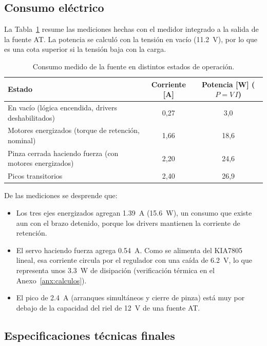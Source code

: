 \subsection{Consumo eléctrico}
La Tabla~\ref{tab:consumo} resume las mediciones hechas con el medidor integrado a la salida
de la fuente AT. La potencia se calculó con la tensión en vacío (\SI{11,2}{\volt}), por lo que
es una cota superior si la tensión baja con la carga.

\begin{table}[H]
\centering\small
\caption{Consumo medido de la fuente en distintos estados de operación.}\label{tab:consumo}
\begin{tabular}{@{}lcc@{}}
\toprule
\textbf{Estado} & \textbf{Corriente [A]} & \textbf{Potencia [W]} ($P=V\,I$)\\
\midrule
En vacío (lógica encendida, drivers deshabilitados) & 0,27 & 3,0\\
Motores energizados (torque de retención, nominal)  & 1,66 & 18,6\\
Pinza cerrada haciendo fuerza (con motores energizados) & 2,20 & 24,6\\
Picos transitorios & 2,40 & 26,9\\
\bottomrule
\end{tabular}
\end{table}

De las mediciones se desprende que:
\begin{itemize}
  \item Los tres ejes energizados agregan \SI{1,39}{\ampere} (\SI{15,6}{\watt}), un consumo
        que existe aun con el brazo detenido, porque los drivers mantienen la corriente de
        retención.
  \item El servo haciendo fuerza agrega \SI{0,54}{\ampere}. Como se alimenta del KIA7805 lineal,
        esa corriente circula por el regulador con una caída de \SI{6,2}{\volt}, lo que
        representa unos \SI{3,3}{\watt} de disipación (verificación térmica en el
        Anexo~\ref{anx:calculos}).
  \item El pico de \SI{2,4}{\ampere} (arranques simultáneos y cierre de pinza) está muy por
        debajo de la capacidad del riel de \SI{12}{\volt} de una fuente AT.
\end{itemize}

\subsection{Especificaciones técnicas finales}

